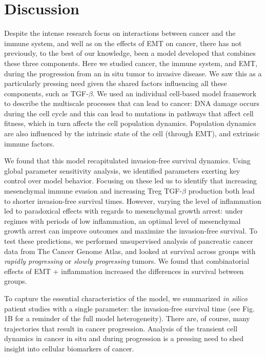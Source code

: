 \documentclass[11pt]{article}
\begin{document}
\section{Discussion}\label{Discussion}
Despite the intense research focus on interactions between cancer and the immune system, and well as on the effects of EMT on cancer, there has not previously, to the best of our knowledge, been a model developed that combines these three components. Here we studied cancer, the immune system, and EMT, during the progression from an in situ tumor to invasive disease. We saw this as a particularly pressing need given the shared factors influencing all these components, such as TGF-$\beta$. We used an individual cell-based model framework to describe the multiscale processes that can lead to cancer: DNA damage occurs during the cell cycle and this can lead to mutations in pathways that affect cell fitness, which in turn affects the cell population dynamics. Population dynamics are also influenced by the intrinsic state of the cell (through EMT), and extrinsic immune factors.
\par
We found that this model recapitulated invasion-free survival dynamics. Using global parameter sensitivity analysis, we identified parameters exerting key control over model behavior. Focusing on these led us to identify that increasing mesenchymal immune evasion and increasing Treg TGF-$\beta$ production both lead to shorter invasion-free survival times. However, varying the level of inflammation led to paradoxical effects with regards to mesenchymal growth arrest: under regimes with periods of low inflammation, an optimal level of mesenchymal growth arrest can improve outcomes and maximize the invasion-free survival. To test these predictions, we performed unsupervised analysis of pancreatic cancer data from The Cancer Genome Atlas, and looked at survival across groups with {\em rapidly progressing} or {\em slowly progressing}  tumors. We found that combinatorial effects of EMT + inflammation increased the differences in survival between groups.
\par
To capture the essential characteristics of the model, we summarized {\em in silico} patient studies with a single parameter: the invasion-free survival time (see Fig. 1B for a reminder of the full model heterogeneity). There are, of course, many trajectories that result in cancer progression. Analysis of the transient cell dynamics in cancer in situ and during progression is a pressing need to shed insight into cellular biomarkers of cancer.
\par
\end{document}
